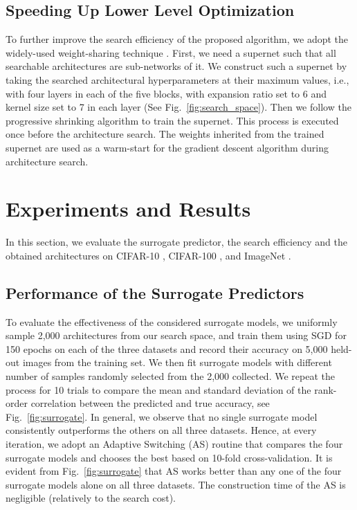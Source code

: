 \documentclass[runningheads]{llncs}
\begin{document}
\subsection{Speeding Up Lower Level Optimization}
To further improve the search efficiency of the proposed algorithm, we adopt the widely-used weight-sharing technique \cite{smash,luo2018neural,atomnas}. First, we need a supernet such that all searchable architectures are sub-networks of it. We construct such a supernet by taking the searched architectural hyperparameters at their maximum values, i.e., with four layers in each of the five blocks, with expansion ratio set to 6 and kernel size set to 7 in each layer (See Fig.~\ref{fig:search_space}). Then we follow the progressive shrinking algorithm \cite{onceforall} to train the supernet. This process is executed once before the architecture search. The weights inherited from the trained supernet are used as a warm-start for the gradient descent algorithm during architecture search.
 \section{Experiments and Results}
In this section, we evaluate the surrogate predictor, the search efficiency and the obtained architectures on CIFAR-10 \cite{cifar}, CIFAR-100 \cite{cifar}, and ImageNet \cite{imagenet}.

\subsection{Performance of the Surrogate Predictors\label{subsec:surrogate}}
To evaluate the effectiveness of the considered surrogate models, we uniformly sample 2,000 architectures from our search space, and train them using SGD for 150 epochs on each of the three datasets and record their accuracy on 5,000 held-out images from the training set. We then fit surrogate models with different number of samples randomly selected from the 2,000 collected. We repeat the process for 10 trials to compare the mean and standard deviation of the rank-order correlation between the predicted and true accuracy, see Fig.~\ref{fig:surrogate}. In general, we observe that no single surrogate model consistently outperforms the others on all three datasets. Hence, at every iteration, we adopt an Adaptive Switching (AS) routine that compares the four surrogate models and chooses the best based on 10-fold cross-validation. It is evident from Fig.~\ref{fig:surrogate} that AS works better than any one of the four surrogate models alone on all three datasets. The construction time of the AS is negligible (relatively to the search cost).
\end{document}
